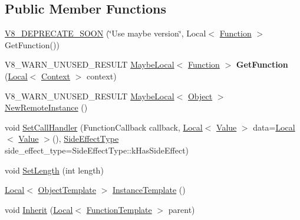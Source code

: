 \subsection*{Public Member Functions}
\begin{DoxyCompactItemize}
\item 
\mbox{\hyperlink{classv8_1_1FunctionTemplate_a007fd05a3fa3c960bf7ddbc05c724d2b}{V8\+\_\+\+D\+E\+P\+R\+E\+C\+A\+T\+E\+\_\+\+S\+O\+ON}} (\char`\"{}Use maybe version\char`\"{}, Local$<$ \mbox{\hyperlink{classv8_1_1Function}{Function}} $>$ Get\+Function())
\item 
\mbox{\label{classv8_1_1FunctionTemplate_a77aa424e4ed297452be0412930340262}} 
V8\+\_\+\+W\+A\+R\+N\+\_\+\+U\+N\+U\+S\+E\+D\+\_\+\+R\+E\+S\+U\+LT \mbox{\hyperlink{classv8_1_1MaybeLocal}{Maybe\+Local}}$<$ \mbox{\hyperlink{classv8_1_1Function}{Function}} $>$ {\bfseries Get\+Function} (\mbox{\hyperlink{classv8_1_1Local}{Local}}$<$ \mbox{\hyperlink{classv8_1_1Context}{Context}} $>$ context)
\item 
V8\+\_\+\+W\+A\+R\+N\+\_\+\+U\+N\+U\+S\+E\+D\+\_\+\+R\+E\+S\+U\+LT \mbox{\hyperlink{classv8_1_1MaybeLocal}{Maybe\+Local}}$<$ \mbox{\hyperlink{classv8_1_1Object}{Object}} $>$ \mbox{\hyperlink{classv8_1_1FunctionTemplate_a06fffd3d45d4f2f1aec8df075961af59}{New\+Remote\+Instance}} ()
\item 
void \mbox{\hyperlink{classv8_1_1FunctionTemplate_ab7b6e9d60595d4cfd6e1a6b59e625830}{Set\+Call\+Handler}} (Function\+Callback callback, \mbox{\hyperlink{classv8_1_1Local}{Local}}$<$ \mbox{\hyperlink{classv8_1_1Value}{Value}} $>$ data=\mbox{\hyperlink{classv8_1_1Local}{Local}}$<$ \mbox{\hyperlink{classv8_1_1Value}{Value}} $>$(), \mbox{\hyperlink{namespacev8_a29711319c2b9fc7716d65faee2f7b9cb}{Side\+Effect\+Type}} side\+\_\+effect\+\_\+type=Side\+Effect\+Type\+::k\+Has\+Side\+Effect)
\item 
void \mbox{\hyperlink{classv8_1_1FunctionTemplate_a5faf23b28ee3480b23ce054d0f389a75}{Set\+Length}} (int length)
\item 
\mbox{\hyperlink{classv8_1_1Local}{Local}}$<$ \mbox{\hyperlink{classv8_1_1ObjectTemplate}{Object\+Template}} $>$ \mbox{\hyperlink{classv8_1_1FunctionTemplate_a00dd9725566908e8fd14064542f5a781}{Instance\+Template}} ()
\item 
void \mbox{\hyperlink{classv8_1_1FunctionTemplate_abc11c462facf11bafd541892815c5425}{Inherit}} (\mbox{\hyperlink{classv8_1_1Local}{Local}}$<$ \mbox{\hyperlink{classv8_1_1FunctionTemplate}{Function\+Template}} $>$ parent)

\end{DoxyCompactItemize}
